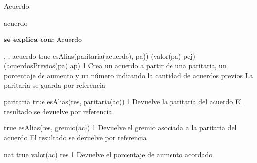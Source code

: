 \begin{interfaz}{Acuerdo}

\begin{iparamformales}{acuerdo}

\textbf{\large se explica con:} Acuerdo

\end{iparamformales}

{, , }{acuerdo}
{true}
{esAlias(paritaria(acuerdo), pa)) \land (valor(pa) \igobs pcj) \land (acuerdosPrevios(pa) \igobs ap)}
{1}
{Crea un acuerdo a partir de una paritaria, un porcentaje de aumento y un número indicando la cantidad de acuerdos previos}
{La paritaria se guarda por referencia}

{}{paritaria}
{true}
{esAlias(res, paritaria(ac))}
{1}
{Devuelve la paritaria del acuerdo}
{El resultado se devuelve por referencia}

{true}
{esAlias(res, gremio(ac))}
{1}
{Devuelve el gremio asociada a la paritaria del acuerdo}
{El resultado se devuelve por referencia}

{}{nat}
{true}
{valor(ac) \igobs res}
{1}
{Devuelve el porcentaje de aumento acordado}
{}

\end{interfaz}